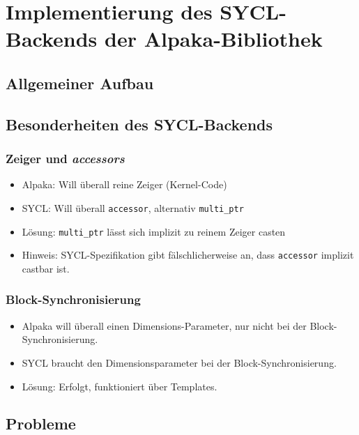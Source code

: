 \chapter{Implementierung des SYCL-Backends der Alpaka-Bibliothek}
\label{implementierung}

\section{Allgemeiner Aufbau}
\label{implementierung:aufbau}

\section{Besonderheiten des SYCL-Backends}
\label{implementierung:besonderheiten}

\subsection{Zeiger und \textit{accessors}}
\label{implementierung:besonderheiten:zeiger}


\begin{itemize}
    \item Alpaka: Will überall reine Zeiger (Kernel-Code)
    \item SYCL: Will überall \texttt{accessor}, alternativ \texttt{multi\_ptr}
    \item Lösung: \texttt{multi\_ptr} lässt sich implizit zu reinem Zeiger casten
    \item Hinweis: SYCL-Spezifikation gibt fälschlicherweise an, dass
          \texttt{accessor} implizit castbar ist.
\end{itemize}

\subsection{Block-Synchronisierung}
\label{implementierung:besonderheiten:synchronisierung}

\begin{itemize}
    \item Alpaka will überall einen Dimensions-Parameter, nur nicht bei der
          Block-Synchronisierung.
    \item SYCL braucht den Dimensionsparameter bei der Block-Synchronisierung.
    \item Lösung: Erfolgt, funktioniert über Templates.
\end{itemize}

\section{Probleme}\label{implementierung:probleme}

